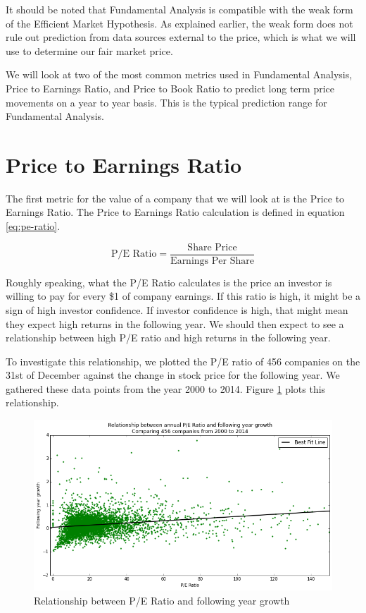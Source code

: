 \documentclass{report}
\begin{document}
It should be noted that Fundamental Analysis is compatible with the weak form of the Efficient Market Hypothesis. As explained earlier, the weak form does not rule out prediction from data sources external to the price, which is what we will use to determine our fair market price.

We will look at two of the most common metrics used in Fundamental Analysis, Price to Earnings Ratio, and Price to Book Ratio to predict long term price movements on a year to year basis. This is the typical prediction range for Fundamental Analysis.

\section{Price to Earnings Ratio}

The first metric for the value of a company that we will look at is the Price to Earnings Ratio. The Price to Earnings Ratio calculation is defined in equation \ref{eq:pe-ratio}.

\begin{center}
\begin{equation}
  \text{P/E Ratio} = \dfrac{\text{Share Price}}{\text{Earnings Per Share}}
\end{equation}
\label{eq:pe-ratio}  
\end{center}

Roughly speaking, what the P/E Ratio calculates is the price an investor is willing to pay for every \$1 of company earnings. If this ratio is high, it might be a sign of high investor confidence. If investor confidence is high, that might mean they expect high returns in the following year. We should then expect to see a relationship between high P/E ratio and high returns in the following year.

To investigate this relationship, we plotted the P/E ratio of 456 companies on the 31st of December against the change in stock price for the following year. We gathered these data points from the year 2000 to 2014. Figure \ref{fig:pe-abs} plots this relationship.

\begin{figure}[H]
	\caption{Relationship between P/E Ratio and following year growth}
	\centerline{\includegraphics[width=\textwidth]{vis/pe-ratio-abs.png}}
	\label{fig:pe-abs}
\end{figure}
\end{document}
